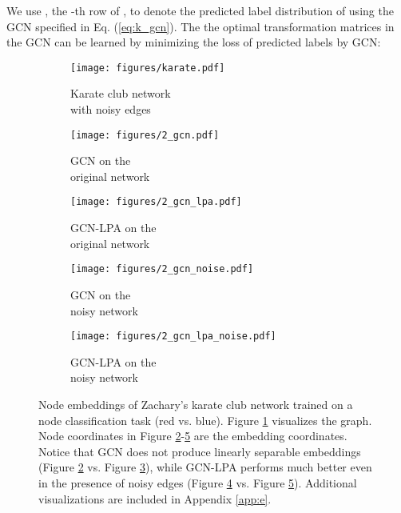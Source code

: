 \documentclass{article}
\begin{document}
		We use , the -th row of , to denote the predicted label distribution of  using the GCN specified in Eq. (\ref{eq:k_gcn}).
		The the optimal transformation matrices in the GCN can be learned by minimizing the loss of predicted labels by GCN:
		
		
		\begin{figure*}
			\centering
			\captionsetup[subfigure]{justification=centering}
			\begin{subfigure}[b]{0.215\textwidth}
   				\texttt{[image: figures/karate.pdf]}
   				\caption{Karate club network\\with noisy edges}
   				\label{fig:karate_1}
			\end{subfigure}
			\hfill
			\begin{subfigure}[b]{0.19\textwidth}
   				\texttt{[image: figures/2\_gcn.pdf]}
   				\caption{GCN on the\\original network}
   				\label{fig:karate_2}
			\end{subfigure}
			\hfill
			\begin{subfigure}[b]{0.19\textwidth}
				\texttt{[image: figures/2\_gcn\_lpa.pdf]}
				\caption{GCN-LPA on the\\original network}
				\label{fig:karate_3}
			\end{subfigure}
			\hfill
			\begin{subfigure}[b]{0.19\textwidth}
   				\texttt{[image: figures/2\_gcn\_noise.pdf]}
   				\caption{GCN on the\\noisy network}
   				\label{fig:karate_4}
			\end{subfigure}
			\hfill
			\begin{subfigure}[b]{0.19\textwidth}
				\texttt{[image: figures/2\_gcn\_lpa\_noise.pdf]}
				\caption{GCN-LPA on the\\noisy network}
				\label{fig:karate_5}
			\end{subfigure}
			\caption{Node embeddings of Zachary's karate club network trained on a node classification task (red vs. blue). Figure \ref{fig:karate_1} visualizes the graph. Node coordinates in Figure \ref{fig:karate_2}-\ref{fig:karate_5} are the embedding coordinates. Notice that GCN does not produce linearly separable embeddings (Figure \ref{fig:karate_2} vs. Figure \ref{fig:karate_3}), while GCN-LPA performs much better even in the presence of noisy edges (Figure \ref{fig:karate_4} vs. Figure \ref{fig:karate_5}).
Additional visualizations are included in Appendix \ref{app:e}.}
			\label{fig:karate}
		\end{figure*}
		
\end{document}
